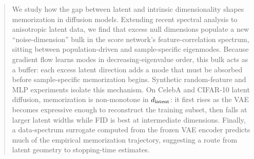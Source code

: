 \begin{abstract}%
We study how the gap between latent and intrinsic dimensionality
shapes memorization in diffusion models. Extending recent spectral
analysis to anisotropic latent data, we find that excess null
dimensions populate a new ``noise-dimension'' bulk in the score
network's feature-correlation spectrum, sitting between
population-driven and sample-specific eigenmodes. Because gradient
flow learns modes in decreasing-eigenvalue order, this bulk acts as
a buffer: each excess latent direction adds a mode that must be
absorbed before sample-specific memorization begins. Synthetic
random-feature and MLP experiments isolate this mechanism. On
CelebA and CIFAR-10 latent diffusion, memorization is
non-monotone in $\dlat$: it first rises as the VAE becomes
expressive enough to reconstruct the training subset, then falls at
larger latent widths while FID is best at intermediate dimensions.
Finally, a data-spectrum surrogate computed from the frozen VAE
encoder predicts much of the empirical memorization trajectory,
suggesting a route from latent geometry to stopping-time estimates.
\end{abstract}
